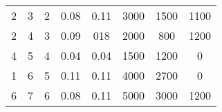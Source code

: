 \begin{table}[]
\begin{tabular}{@{}cccccccc@{}}
2                                                           & 3                                                             & 2                                                    & 0.08                                                                            & 0.11                                                                           & 3000                                                                            & 1500                                                                                & 1100                                                                 \\
2                                                           & 4                                                             & 3                                                    & 0.09                                                                            & 018                                                                            & 2000                                                                            & 800                                                                                 & 1200                                                                 \\
4                                                           & 5                                                             & 4                                                    & 0.04                                                                            & 0.04                                                                           & 1500                                                                            & 1200                                                                                & 0                                                                    \\
1                                                           & 6                                                             & 5                                                    & 0.11                                                                            & 0.11                                                                           & 4000                                                                            & 2700                                                                                & 0                                                                    \\
6                                                           & 7                                                             & 6                                                    & 0.08                                                                            & 0.11                                                                           & 5000                                                                            & 3000                                                                                & 1200                                                                 \\

\end{tabular}
\end{table}
